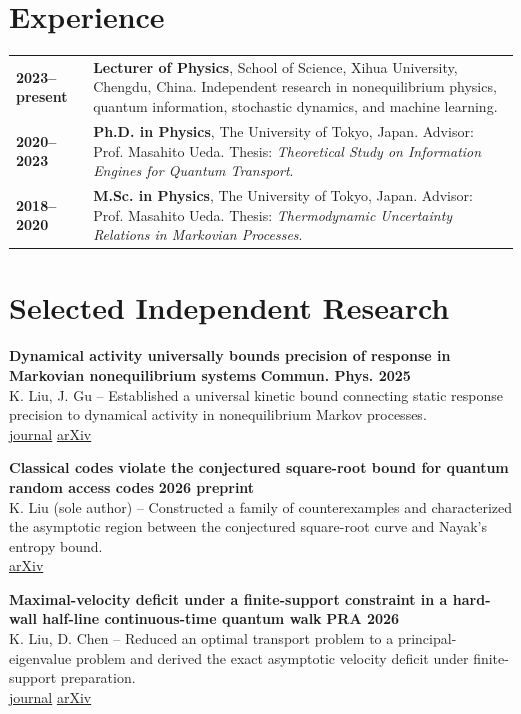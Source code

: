 \documentclass[10pt,a4paper]{article}
\newcommand{\role}[1]{\textbf{#1}}
\newcommand{\where}[1]{\textcolor{muted}{#1}}
\newcommand{\paper}[1]{\textit{#1}}
\newcommand{\link}[2]{\href{#1}{#2}}
\begin{document}
\section*{Experience}
\begin{tabularx}{\textwidth}{@{}p{2.8cm}X@{}}
\textbf{2023--present} & \role{Lecturer of Physics}, School of Science, Xihua University, Chengdu, China. Independent research in nonequilibrium physics, quantum information, stochastic dynamics, and machine learning.\\[3pt]
\textbf{2020--2023} & \role{Ph.D. in Physics}, The University of Tokyo, Japan. Advisor: Prof. Masahito Ueda. Thesis: \paper{Theoretical Study on Information Engines for Quantum Transport}.\\[3pt]
\textbf{2018--2020} & \role{M.Sc. in Physics}, The University of Tokyo, Japan. Advisor: Prof. Masahito Ueda. Thesis: \paper{Thermodynamic Uncertainty Relations in Markovian Processes}.\\
\end{tabularx}

\newpage

\section*{Selected Independent Research}
\textbf{Dynamical activity universally bounds precision of response in Markovian nonequilibrium systems} \hfill \textbf{Commun. Phys. 2025}\\
\where{K. Liu, J. Gu} -- Established a universal kinetic bound connecting static response precision to dynamical activity in nonequilibrium Markov processes.\\[-1pt]
\link{https://www.nature.com/articles/s42005-025-01982-w}{journal} \;\; \link{https://arxiv.org/abs/2410.20800}{arXiv}

\vspace{2pt}
\textbf{Classical codes violate the conjectured square-root bound for quantum random access codes} \hfill \textbf{2026 preprint}\\
\where{K. Liu (sole author)} -- Constructed a family of counterexamples and characterized the asymptotic region between the conjectured square-root curve and Nayak's entropy bound.\\[-1pt]
\link{https://arxiv.org/abs/2607.15617}{arXiv}

\vspace{2pt}
\textbf{Maximal-velocity deficit under a finite-support constraint in a hard-wall half-line continuous-time quantum walk} \hfill \textbf{PRA 2026}\\
\where{K. Liu, D. Chen} -- Reduced an optimal transport problem to a principal-eigenvalue problem and derived the exact asymptotic velocity deficit under finite-support preparation.\\[-1pt]
\link{https://journals.aps.org/pra/abstract/10.1103/dyyr-z1k8}{journal} \;\; \link{https://arxiv.org/abs/2609.01970}{arXiv}
\end{document}
